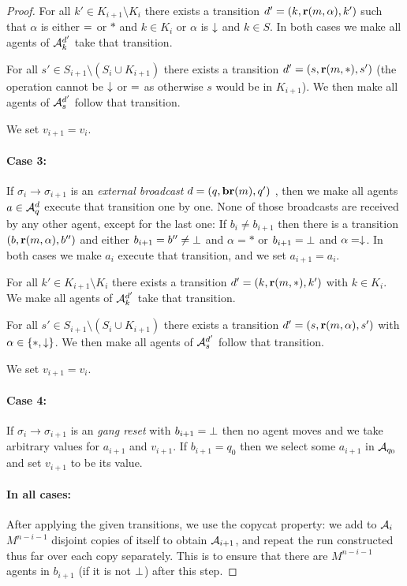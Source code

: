 \begin{proof}
For all $k' \in K_{i+1} \setminus K_i$ there exists a transition $d'=(k, \textbf{r}(m, \alpha), k')$ such that $\alpha$ is either ${=}$ or $*$ and $k \in K_i$ or $\alpha$ is $\downarrow$ and $k\in S$.
In both cases we make all agents of $\mathcal{A}_k^{d'}$ take that transition.

For all $s' \in S_{i+1} \setminus (S_i \cup K_{i+1})$ there exists a transition $d'=(s,\textbf{r}(m, *),s')$ (the operation cannot be $\downarrow$ or ${=}$ as otherwise $s$ would be in $K_{i+1}$). We then make all agents of $\mathcal{A}_s^{d'}$ follow that transition. 

We set $v_{i+1} = v_i$.

\paragraph{Case 3: } If $\sigma_i \to \sigma_{i+1}$ is an \emph{external broadcast} $d = (q, \textbf{br}(m), q')$ , then we make all agents $a \in \mathcal{A}_q^{d}$ execute that transition one by one. None of those broadcasts are received by any other agent, except for the last one:
If $b_i \neq b_{i+1}$ then there is a transition $(b, \textbf{r}(m, \alpha), b'')$ and either $b_{i+1} = b'' \neq \bot$ and $\alpha = *$ or $b_{i+1} = \bot$ and $\alpha=\downarrow$. In both cases we make $a_i$ execute that transition, and we set $a_{i+1} = a_i$.

For all $k' \in K_{i+1} \setminus K_i$ there exists a transition $d'=(k, \textbf{r}(m, *), k')$ with $k \in K_i$. We make all agents of $\mathcal{A}_k^{d'}$ take that transition.

For all $s' \in S_{i+1} \setminus (S_i \cup K_{i+1})$ there exists a transition $d'=(s,\textbf{r}(m, \alpha),s')$ with $\alpha \in \{*, \downarrow\}$. We then make all agents of $\mathcal{A}_s^{d'}$ follow that transition. 

We set $v_{i+1} = v_i$.

\paragraph{Case 4: } If $\sigma_i \to \sigma_{i+1}$ is an \emph{gang reset} with $b_{i+1} = \bot$ then no agent moves and we take arbitrary values for $a_{i+1}$ and $v_{i+1}$. If $b_{i+1}= q_0$ then we select some $a_{i+1}$ in $\mathcal{A}_{q_0}$ and set $v_{i+1}$ to be its value.

\paragraph{In all cases:} After applying the given transitions, we use the copycat property: we add to $\mathcal{A}_i$ $M^{n-i-1}$ disjoint copies of itself to obtain $\mathcal{A}_{i+1}$, and repeat the run constructed thus far over each copy separately. This is to ensure that there are $M^{n-i-1}$ agents in $b_{i+1}$ (if it is not $\bot$) after this step.


\end{proof}
